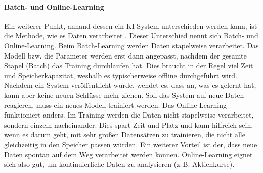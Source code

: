 \paragraph{Batch- und Online-Learning}
Ein weiterer Punkt, anhand dessen ein KI-System unterschieden
werden kann, ist die Methode, wie es Daten verarbeitet \parencite[15]{book:hands-on-ml}.
Dieser Unterschied nennt sich Batch- und Online-Learning.
Beim Batch-Learning werden Daten stapelweise verarbeitet.
Das Modell bzw. die Parameter werden erst dann angepasst,
nachdem der gesamte Stapel (Batch) das Training durchlaufen hat.
Dies braucht in der Regel viel Zeit und Speicherkapazität, weshalb
es typischerweise offline durchgeführt wird.
Nachdem ein System veröffentlicht wurde, wendet es, dass an, was es gelernt hat,
kann aber keine neuen Schlüsse mehr ziehen.
Soll das System auf neue Daten reagieren, muss ein neues Modell trainiert werden.
Das Online-Learning funktioniert anders.
Im Training werden die Daten nicht stapelweise verarbeitet,
sondern einzeln nacheinander.
Dies spart Zeit und Platz und kann hilfreich sein, wenn es darum geht,
mit sehr großen Datensätzen zu trainieren, die nicht alle gleichzeitig
in den Speicher passen würden.
Ein weiterer Vorteil ist der, dass neue Daten spontan auf dem Weg
verarbeitet werden können. Online-Learning eignet sich also gut,
um kontinuierliche Daten zu analysieren (z.\,B. Aktienkurse).

